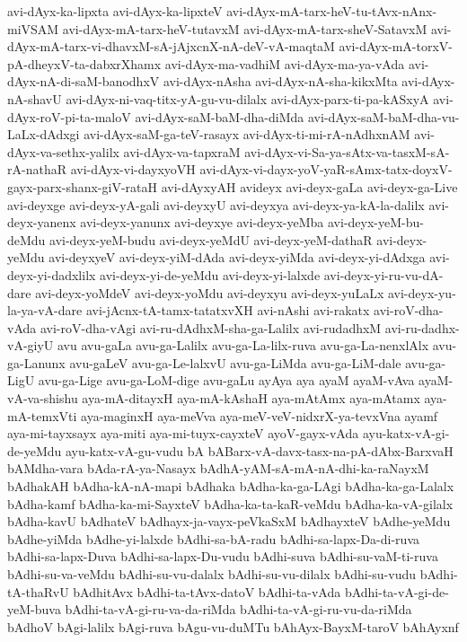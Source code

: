 {avi-dAyx-ka-lipxta
avi-dAyx-ka-lipxteV
avi-dAyx-mA-tarx-heV-tu-tAvx-nAnx-miVSAM
avi-dAyx-mA-tarx-heV-tutavxM
avi-dAyx-mA-tarx-sheV-SatavxM
avi-dAyx-mA-tarx-vi-dhavxM-sA-jAjxcnX-nA-deV-vA-maqtaM
avi-dAyx-mA-torxV-pA-dheyxV-ta-dabxrXhamx
avi-dAyx-ma-vadhiM
avi-dAyx-ma-ya-vAda
avi-dAyx-nA-di-saM-banodhxV
avi-dAyx-nAsha
avi-dAyx-nA-sha-kikxMta
avi-dAyx-nA-shavU
avi-dAyx-ni-vaq-titx-yA-gu-vu-dilalx
avi-dAyx-parx-ti-pa-kASxyA
avi-dAyx-roV-pi-ta-maloV
avi-dAyx-saM-baM-dha-diMda
avi-dAyx-saM-baM-dha-vu-LaLx-dAdxgi
avi-dAyx-saM-ga-teV-rasayx
avi-dAyx-ti-mi-rA-nAdhxnAM
avi-dAyx-va-sethx-yalilx
avi-dAyx-va-tapxraM
avi-dAyx-vi-Sa-ya-sAtx-va-tasxM-sA-rA-nathaR
avi-dAyx-vi-dayxyoVH
avi-dAyx-vi-dayx-yoV-yaR-sAmx-tatx-doyxV-gayx-parx-shanx-giV-rataH
avi-dAyxyAH
avideyx
avi-deyx-gaLa
avi-deyx-ga-Live
avi-deyxge
avi-deyx-yA-gali
avi-deyxyU
avi-deyxya
avi-deyx-ya-kA-la-dalilx
avi-deyx-yanenx
avi-deyx-yanunx
avi-deyxye
avi-deyx-yeMba
avi-deyx-yeM-bu-deMdu
avi-deyx-yeM-budu
avi-deyx-yeMdU
avi-deyx-yeM-dathaR
avi-deyx-yeMdu
avi-deyxyeV
avi-deyx-yiM-dAda
avi-deyx-yiMda
avi-deyx-yi-dAdxga
avi-deyx-yi-dadxlilx
avi-deyx-yi-de-yeMdu
avi-deyx-yi-lalxde
avi-deyx-yi-ru-vu-dA-dare
avi-deyx-yoMdeV
avi-deyx-yoMdu
avi-deyxyu
avi-deyx-yuLaLx
avi-deyx-yu-la-ya-vA-dare
avi-jAcnx-tA-tamx-tatatxvXH
avi-nAshi
avi-rakatx
avi-roV-dha-vAda
avi-roV-dha-vAgi
avi-ru-dAdhxM-sha-ga-Lalilx
avi-rudadhxM
avi-ru-dadhx-vA-giyU
avu
avu-gaLa
avu-ga-Lalilx
avu-ga-La-lilx-ruva
avu-ga-La-nenxlAlx
avu-ga-Lanunx
avu-gaLeV
avu-ga-Le-lalxvU
avu-ga-LiMda
avu-ga-LiM-dale
avu-ga-LigU
avu-ga-Lige
avu-ga-LoM-dige
avu-gaLu
ayAya
aya
ayaM
ayaM-vAva
ayaM-vA-va-shishu
aya-mA-ditayxH
aya-mA-kAshaH
aya-mAtAmx
aya-mAtamx
aya-mA-temxVti
aya-maginxH
aya-meVva
aya-meV-veV-nidxrX-ya-tevxVna
ayamf
aya-mi-tayxsayx
aya-miti
aya-mi-tuyx-cayxteV
ayoV-gayx-vAda
ayu-katx-vA-gi-de-yeMdu
ayu-katx-vA-gu-vudu
bA
bABarx-vA-davx-tasx-na-pA-dAbx-BarxvaH
bAMdha-vara
bAda-rA-ya-Nasayx
bAdhA-yAM-sA-mA-nA-dhi-ka-raNayxM
bAdhakAH
bAdha-kA-nA-mapi
bAdhaka
bAdha-ka-ga-LAgi
bAdha-ka-ga-Lalalx
bAdha-kamf
bAdha-ka-mi-SayxteV
bAdha-ka-ta-kaR-veMdu
bAdha-ka-vA-gilalx
bAdha-kavU
bAdhateV
bAdhayx-ja-vayx-peVkaSxM
bAdhayxteV
bAdhe-yeMdu
bAdhe-yiMda
bAdhe-yi-lalxde
bAdhi-sa-bA-radu
bAdhi-sa-lapx-Da-di-ruva
bAdhi-sa-lapx-Duva
bAdhi-sa-lapx-Du-vudu
bAdhi-suva
bAdhi-su-vaM-ti-ruva
bAdhi-su-va-veMdu
bAdhi-su-vu-dalalx
bAdhi-su-vu-dilalx
bAdhi-su-vudu
bAdhi-tA-thaRvU
bAdhitAvx
bAdhi-ta-tAvx-datoV
bAdhi-ta-vAda
bAdhi-ta-vA-gi-de-yeM-buva
bAdhi-ta-vA-gi-ru-va-da-riMda
bAdhi-ta-vA-gi-ru-vu-da-riMda
bAdhoV
bAgi-lalilx
bAgi-ruva
bAgu-vu-duMTu
bAhAyx-BayxM-taroV
bAhAyxnf
}
